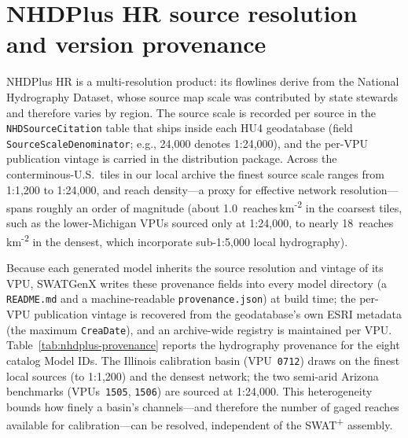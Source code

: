 \section{NHDPlus HR source resolution and version provenance}
\label{sec:supp-nhdplus-provenance}

NHDPlus HR is a multi-resolution product: its flowlines derive from the National Hydrography Dataset, whose source map scale was contributed by state stewards and therefore varies by region.
The source scale is recorded per source in the \texttt{NHDSourceCitation} table that ships inside each HU4 geodatabase (field \texttt{SourceScaleDenominator}; e.g., 24{,}000 denotes 1:24{,}000), and the per-VPU publication vintage is carried in the distribution package.
Across the conterminous-U.S.\ tiles in our local archive the finest source scale ranges from 1:1{,}200 to 1:24{,}000, and reach density---a proxy for effective network resolution---spans roughly an order of magnitude (about 1.0~reaches\,km\textsuperscript{-2} in the coarsest tiles, such as the lower-Michigan VPUs sourced only at 1:24{,}000, to nearly 18~reaches\,km\textsuperscript{-2} in the densest, which incorporate sub-1:5{,}000 local hydrography).

Because each generated model inherits the source resolution and vintage of its VPU, SWATGenX writes these provenance fields into every model directory (a \texttt{README.md} and a machine-readable \texttt{provenance.json}) at build time; the per-VPU publication vintage is recovered from the geodatabase's own ESRI metadata (the maximum \texttt{CreaDate}), and an archive-wide registry is maintained per VPU.
Table~\ref{tab:nhdplus-provenance} reports the hydrography provenance for the eight catalog Model IDs.
The Illinois calibration basin (VPU~\texttt{0712}) draws on the finest local sources (to 1:1{,}200) and the densest network; the two semi-arid Arizona benchmarks (VPUs~\texttt{1505}, \texttt{1506}) are sourced at 1:24{,}000.
This heterogeneity bounds how finely a basin's channels---and therefore the number of gaged reaches available for calibration---can be resolved, independent of the SWAT\textsuperscript{+} assembly.

\begin{table}[htbp]
  \centering
  \caption{Per-model NHDPlus HR source-resolution and version provenance for the eight catalog Model IDs, read from the \texttt{NHDSourceCitation} table and distribution package of each model's VPU. ``Finest source scale'' is the smallest \texttt{SourceScaleDenominator} present; reach density is total \texttt{NHDFlowline} count per VPU area; the NHDPlus vintage (year-month) is the geodatabase's maximum ESRI \texttt{CreaDate}. All eight models use NHDPlus~HR (existing-network) delineation.}
  \label{tab:nhdplus-provenance}
  \footnotesize
  \setlength{\tabcolsep}{4pt}
  \renewcommand{\arraystretch}{1.15}
\end{table}
